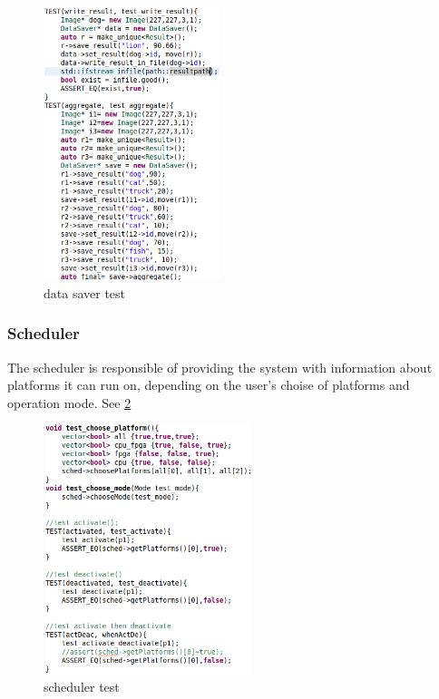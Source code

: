 \documentclass[parskip=full]{scrartcl}
\begin{document}
\begin{figure}[h]
		\centering
		\includegraphics[width=0.46\textwidth]{data_saver_test}
		\caption{data saver test}
		\label{fig:data_saver_test}
\end{figure}

\subsubsection{Scheduler}
The scheduler is responsible of providing the system with information about platforms it can run on, depending on the user's choise of platforms and operation mode. See \ref{fig:scheduler_test} %

\begin{figure}[h]
		\centering
		\includegraphics[width=0.54\textwidth]{scheduler_test}
		\caption{scheduler test}
		\label{fig:scheduler_test}
\end{figure}
\end{document}
